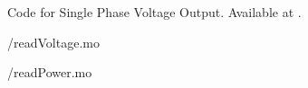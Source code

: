 \begin{OpenModelicacode}
  {Code for Single Phase Voltage Output.
    Available at .}
  \label{OpenModelica:voltage-modbus}
  
  {\LocMODOpenModelicacode/readVoltage.mo}
\end{OpenModelicacode}

\begin{OpenModelicacode}
  \label{OpenModelica:modbus-power}
  
  {\LocMODOpenModelicacode/readPower.mo}
\end{OpenModelicacode}
